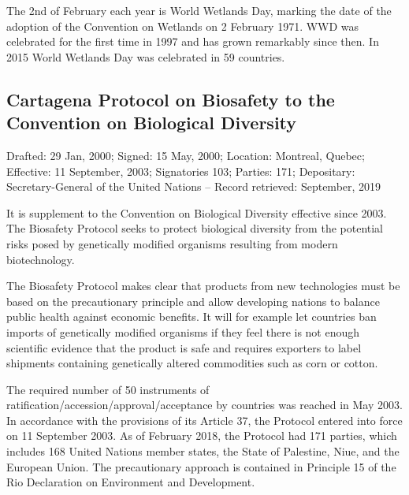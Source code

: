 \documentclass[
  openany]{book}
\begin{document}
The 2nd of February each year is World Wetlands Day, marking the date of the adoption of the Convention on Wetlands on 2 February 1971. WWD was celebrated for the first time in 1997 and has grown remarkably since then. In 2015 World Wetlands Day was celebrated in 59 countries.

\hypertarget{cartagena-protocol-on-biosafety-to-the-convention-on-biological-diversity}{%
\subsection{Cartagena Protocol on Biosafety to the Convention on Biological Diversity}\label{cartagena-protocol-on-biosafety-to-the-convention-on-biological-diversity}}

Drafted: 29 Jan, 2000; Signed: 15 May, 2000; Location: Montreal, Quebec; Effective: 11 September, 2003; Signatories 103; Parties: 171; Depositary: Secretary-General of the United Nations -- Record retrieved: September, 2019

It is supplement to the Convention on Biological Diversity effective since 2003. The Biosafety Protocol seeks to protect biological diversity from the potential risks posed by genetically modified organisms resulting from modern biotechnology.

The Biosafety Protocol makes clear that products from new technologies must be based on the precautionary principle and allow developing nations to balance public health against economic benefits. It will for example let countries ban imports of genetically modified organisms if they feel there is not enough scientific evidence that the product is safe and requires exporters to label shipments containing genetically altered commodities such as corn or cotton.

The required number of 50 instruments of ratification/accession/approval/acceptance by countries was reached in May 2003. In accordance with the provisions of its Article 37, the Protocol entered into force on 11 September 2003. As of February 2018, the Protocol had 171 parties, which includes 168 United Nations member states, the State of Palestine, Niue, and the European Union.
The precautionary approach is contained in Principle 15 of the Rio Declaration on Environment and Development.
\end{document}
